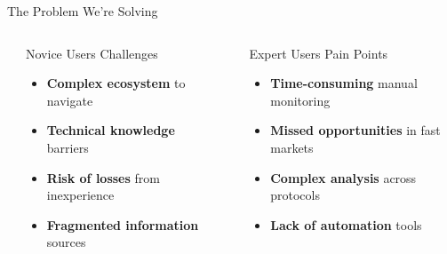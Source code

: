 \documentclass[aspectratio=169]{beamer}
\providecommand{\faMissed}{\faTimesCircle}
\begin{document}
\begin{frame}{The Problem We're Solving}
\vspace{0.05cm}
\begin{columns}[c]
\begin{center}
\end{center}

\vspace{0.05cm}

\begin{block}{Novice Users Challenges}
\vspace{0.05cm}
\begin{itemize}
\setlength\itemsep{-0.1em}
\setlength\leftmargin{1em}
\item[\color{accent}\faExclamationTriangle] \textbf{Complex ecosystem} to navigate
\item[\color{accent}\faQuestion] \textbf{Technical knowledge} barriers
\item[\color{accent}\faExclamation] \textbf{Risk of losses} from inexperience  
\item[\color{accent}\faPuzzlePiece] \textbf{Fragmented information} sources
\end{itemize}
\vspace{0.05cm}
\end{block}


\begin{center}
\end{center}

\vspace{0.05cm}

\begin{block}{Expert Users Pain Points}
\vspace{0.05cm}
\begin{itemize}
\setlength\itemsep{-0.1em}
\setlength\leftmargin{1em}
\item[\color{secondary}\faClock] \textbf{Time-consuming} manual monitoring
\item[\color{secondary}\faMissed] \textbf{Missed opportunities} in fast markets
\item[\color{secondary}\faChartBar] \textbf{Complex analysis} across protocols
\item[\color{secondary}\faRobot] \textbf{Lack of automation} tools
\end{itemize}
\vspace{0.05cm}
\end{block}
\end{columns}


\end{frame}
\end{document}

